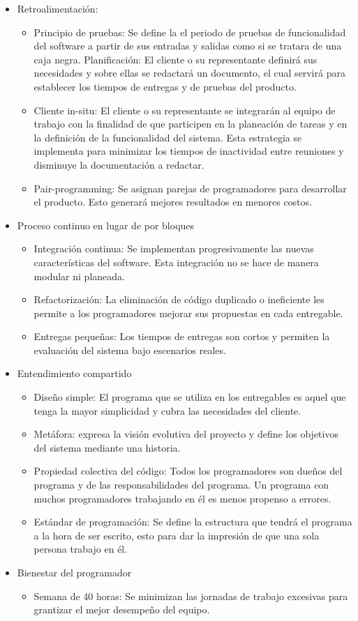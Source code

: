 \begin{itemize}
	\item Retroalimentación:
		\begin{itemize}
			\item Principio de pruebas: Se define la el periodo de pruebas de funcionalidad del software a partir de sus entradas y salidas como si se tratara de una caja negra.
Planificación: El cliente o su representante definirá sus necesidades y sobre ellas se redactará un documento, el cual servirá para establecer los tiempos de entregas y de pruebas del producto.
			\item Cliente in-situ: El cliente o su representante se integrarán al equipo de trabajo con la finalidad de que participen en la planeación de tareas y en la definición de la funcionalidad del sistema. Esta estrategia se implementa para minimizar los tiempos de inactividad entre reuniones y disminuye la documentación a redactar.
			\item Pair-programming: Se asignan parejas de programadores para desarrollar el producto. Esto generará mejores resultados en menores costos.
		\end{itemize}
	\item Proceso continuo en lugar de por bloques
		\begin{itemize}
			\item Integración continua: Se implementan progresivamente las nuevas características del software. Esta integración no se hace de manera modular ni planeada.
			\item Refactorización: La eliminación de código duplicado o ineficiente les permite a los programadores mejorar sus propuestas en cada entregable.
			\item Entregas pequeñas: Los tiempos de entregas son cortos y permiten la evaluación del sistema bajo escenarios reales.
		\end{itemize}
	\item Entendimiento compartido
		\begin{itemize}
			\item Diseño simple: El programa que se utiliza en los entregables es aquel que tenga la mayor simplicidad y cubra las necesidades del cliente.
			\item Metáfora: expresa la visión evolutiva del proyecto y define los objetivos del sistema mediante una historia.
			\item Propiedad colectiva del código: Todos los programadores son dueños del programa y de las responsabilidades del programa. Un programa con muchos programadores trabajando en él es menos propenso a errores. 
			\item Estándar de programación: Se define la estructura que tendrá el programa a la hora de ser escrito, esto para dar la impresión de que una sola persona trabajo en él.
		\end{itemize}
	\item Bienestar del programador
		\begin{itemize}
			\item Semana de 40 horas: Se minimizan las jornadas de trabajo excesivas para grantizar el mejor desempeño del equipo\cite{Ref_XPPrincipios}.
		\end{itemize}
\end{itemize}
